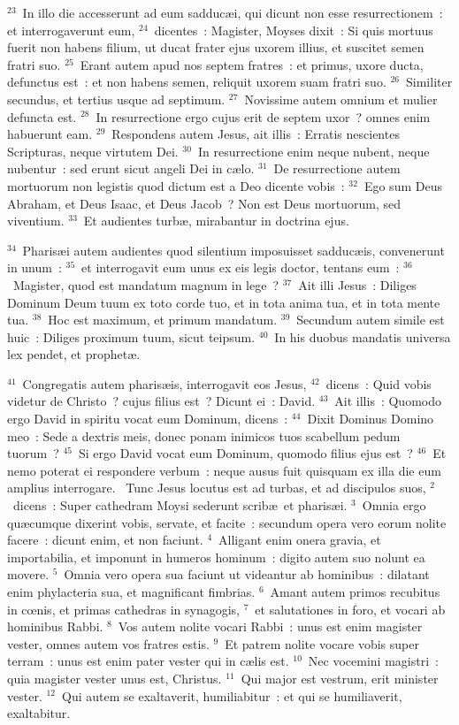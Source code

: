 ${}^{23}$~In illo die accesserunt ad eum sadduc\ae i, qui dicunt non esse resurrectionem~: et interrogaverunt eum,
${}^{24}$~dicentes~: Magister, Moyses dixit~: Si quis mortuus fuerit non habens filium, ut ducat frater ejus uxorem illius, et suscitet semen fratri suo.
${}^{25}$~Erant autem apud nos septem fratres~: et primus, uxore ducta, defunctus est~: et non habens semen, reliquit uxorem suam fratri suo.
${}^{26}$~Similiter secundus, et tertius usque ad septimum.
${}^{27}$~Novissime autem omnium et mulier defuncta est.
${}^{28}$~In resurrectione ergo cujus erit de septem uxor~? omnes enim habuerunt eam.
${}^{29}$~Respondens autem Jesus, ait illis~: Erratis nescientes Scripturas, neque virtutem Dei.
${}^{30}$~In resurrectione enim neque nubent, neque nubentur~: sed erunt sicut angeli Dei in c\ae lo.
${}^{31}$~De resurrectione autem mortuorum non legistis quod dictum est a Deo dicente vobis~:
${}^{32}$~Ego sum Deus Abraham, et Deus Isaac, et Deus Jacob~? Non est Deus mortuorum, sed viventium.
${}^{33}$~Et audientes turb\ae , mirabantur in doctrina ejus.


${}^{34}$~Pharis\ae i autem audientes quod silentium imposuisset sadduc\ae is, convenerunt in unum~:
${}^{35}$~et interrogavit eum unus ex eis legis doctor, tentans eum~:
${}^{36}$~Magister, quod est mandatum magnum in lege~?
${}^{37}$~Ait illi Jesus~: Diliges Dominum Deum tuum ex toto corde tuo, et in tota anima tua, et in tota mente tua.
${}^{38}$~Hoc est maximum, et primum mandatum.
${}^{39}$~Secundum autem simile est huic~: Diliges proximum tuum, sicut teipsum.
${}^{40}$~In his duobus mandatis universa lex pendet, et prophet\ae .


${}^{41}$~Congregatis autem pharis\ae is, interrogavit eos Jesus,
${}^{42}$~dicens~: Quid vobis videtur de Christo~? cujus filius est~? Dicunt ei~: David.
${}^{43}$~Ait illis~: Quomodo ergo David in spiritu vocat eum Dominum, dicens~:
${}^{44}$~Dixit Dominus Domino meo~: Sede a dextris meis, donec ponam inimicos tuos scabellum pedum tuorum~?
${}^{45}$~Si ergo David vocat eum Dominum, quomodo filius ejus est~?
${}^{46}$~Et nemo poterat ei respondere verbum~: neque ausus fuit quisquam ex illa die eum amplius interrogare.
~Tunc Jesus locutus est ad turbas, et ad discipulos suos,
${}^{2}$~dicens~: Super cathedram Moysi sederunt scrib\ae\ et pharis\ae i.
${}^{3}$~Omnia ergo qu\ae cumque dixerint vobis, servate, et facite~: secundum opera vero eorum nolite facere~: dicunt enim, et non faciunt.
${}^{4}$~Alligant enim onera gravia, et importabilia, et imponunt in humeros hominum~: digito autem suo nolunt ea movere.
${}^{5}$~Omnia vero opera sua faciunt ut videantur ab hominibus~: dilatant enim phylacteria sua, et magnificant fimbrias.
${}^{6}$~Amant autem primos recubitus in cœnis, et primas cathedras in synagogis,
${}^{7}$~et salutationes in foro, et vocari ab hominibus Rabbi.
${}^{8}$~Vos autem nolite vocari Rabbi~: unus est enim magister vester, omnes autem vos fratres estis.
${}^{9}$~Et patrem nolite vocare vobis super terram~: unus est enim pater vester qui in c\ae lis est.
${}^{10}$~Nec vocemini magistri~: quia magister vester unus est, Christus.
${}^{11}$~Qui major est vestrum, erit minister vester.
${}^{12}$~Qui autem se exaltaverit, humiliabitur~: et qui se humiliaverit, exaltabitur.


